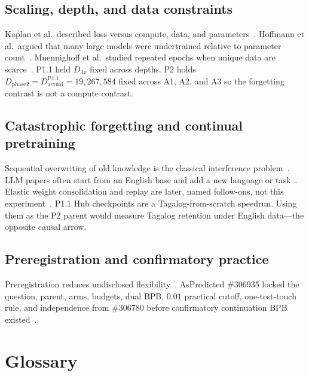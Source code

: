 \documentclass[11pt,a4paper]{article}
\begin{document}
\subsection{Scaling, depth, and data constraints}
Kaplan et al.\ described loss versus compute, data, and parameters~\cite{kaplan2020scaling}. Hoffmann et al.\ argued that many large models were undertrained relative to parameter count~\cite{hoffmann2022chinchilla}. Muennighoff et al.\ studied repeated epochs when unique data are scarce~\cite{muennighoff2023dataconstrained}. P1.1 held $D_{3x}$ fixed across depths. P2 holds $D_{\mathrm{phase2}}=D_{\mathrm{actual}}^{\mathrm{P1.1}}=19{,}267{,}584$ fixed across A1, A2, and A3 so the forgetting contrast is not a compute contrast.

\subsection{Catastrophic forgetting and continual pretraining}
Sequential overwriting of old knowledge is the classical interference problem~\cite{mccloskey1989catastrophic,french1999cf,goodfellow2013cf}. LLM papers often start from an English base and add a new language or task~\cite{luo2023forgetting,ramasesh2021forgetscale,shi2024continual}. Elastic weight consolidation and replay are later, named follow-ons, not this experiment~\cite{kirkpatrick2017ewc,lopezpaz2017gem}. P1.1 Hub checkpoints are a Tagalog-from-scratch speedrun. Using them as the P2 parent would measure Tagalog retention under English data---the opposite causal arrow.

\subsection{Preregistration and confirmatory practice}
Preregistration reduces undisclosed flexibility~\cite{simmons2011falsepositive,wagenmakers2012confirmatory,nosek2018prereg}. AsPredicted \#306935 locked the question, parent, arms, budgets, dual BPB, $0.01$ practical cutoff, one-test-touch rule, and independence from \#306780 before confirmatory continuation BPB existed~\cite{aspredicted306935}.

\section{Glossary}
\label{sec:glossary}
\end{document}
